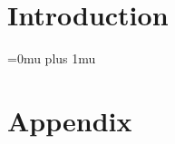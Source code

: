 




\sloppy
{}


\date{\today}
\clearpage

\chapter*{Introduction}\label{ch:sample}




\clearpage
\Urlmuskip=0mu plus 1mu\relax
\sloppy

{}

\chapter*{Appendix}\label{ch:appendix}



